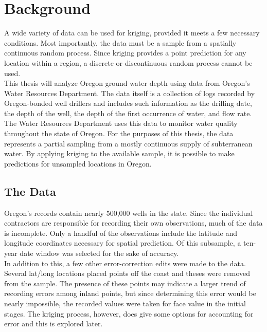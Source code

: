 \documentclass[12pt,twoside]{reedthesis}
\begin{document}
\section{Background}
A wide variety of data can be used for kriging, provided it meets a few necessary conditions. Most importantly, the data must be a sample from a spatially continuous random process. Since kriging provides a point prediction for any location within a region, a discrete or discontinuous random process cannot be used. \\

This thesis will analyze Oregon ground water depth using data from Oregon's Water Resources Department. The data itself is a collection of logs recorded by Oregon-bonded well drillers and includes such information as the drilling date, the depth of the well, the depth of the first occurrence of water, and flow rate. The Water Resources Department uses this data to monitor water quality throughout the state of Oregon. For the purposes of this thesis, the data represents a partial sampling from a mostly continuous supply of subterranean water. By applying kriging to the available sample, it is possible to make predictions for unsampled locations in Oregon. \\


\subsection{The Data}

Oregon's records contain nearly 500,000 wells in the state. Since the individual contractors are responsible for recording their own observations, much of the data is incomplete. Only a handful of the observations include the latitude and longitude coordinates necessary for spatial prediction. Of this subsample, a ten-year date window was selected for the sake of accuracy. \\

In addition to this, a few other error-correction edits were made to the data. Several lat/long locations placed points off the coast and theses were removed from the sample. The presence of these points may indicate a larger trend of recording errors among inland points, but since determining this error would be nearly impossible, the recorded values were taken for face value in the initial stages. The kriging process, however, does give some options for accounting for error and this is explored later. \\
\end{document}
